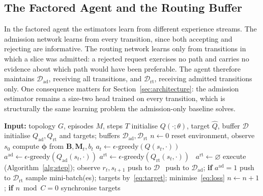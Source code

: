 \documentclass[10pt,journal,comsoc]{IEEEtran}
\begin{document}
\subsection{The Factored Agent and the Routing Buffer}
In the factored agent the estimators learn from different experience
streams. The admission network learns from every transition, since both
accepting and rejecting are informative. The routing network learns only
from transitions in which a slice was admitted: a rejected request
exercises no path and carries no evidence about which path would have been
preferable. The agent therefore maintains $\mathcal{D}_{\text{ad}}$,
receiving all transitions, and $\mathcal{D}_{\text{rt}}$, receiving
admitted transitions only. One consequence matters for
Section~\ref{sec:architecture}: the admission estimator remains a size-two
head trained on every transition, which is structurally the same learning
problem the admission-only baseline solves.

\begin{algorithm}[t]
\caption{Training loop for both architectures}
\label{alg:training}
\scriptsize
\begin{algorithmic}[1]
\State \textbf{Input:} topology $G$, episodes $M$, steps $T$
    \State initialise $Q(\cdot;\theta)$, target $\hat{Q}$, buffer $\mathcal{D}$
\Else
    \State initialise $Q_{\text{ad}},Q_{\text{rt}}$ and targets; buffers $\mathcal{D}_{\text{ad}},\mathcal{D}_{\text{rt}}$
\EndIf
\State $n \gets 0$
  \State reset environment, observe $s_0$
    \State compute $\boldsymbol{\phi}$ from $\mathbf{B},\mathbf{M}_t,b_t$ 
        \State $a_t \gets \epsilon\text{-greedy}(Q(s_t,\cdot))$
    \Else
        \State $a^{\text{ad}} \gets \epsilon\text{-greedy}(Q_{\text{ad}}(s_t,\cdot))$
         $a^{\text{rt}} \gets \epsilon\text{-greedy}(Q_{\text{rt}}(s_t,\cdot))$
        \Else\ $a^{\text{rt}} \gets \varnothing$ \EndIf
    \EndIf
    \State execute (Algorithm~\ref{alg:step}); observe $r_t,s_{t+1}$
     push to $\mathcal{D}$
    \Else\ push to $\mathcal{D}_{\text{ad}}$; \textbf{if} $a^{\text{ad}}=1$ push to $\mathcal{D}_{\text{rt}}$
    \EndIf
    \State sample mini-batch(es); targets by~\eqref{eq:target}; minimise~\eqref{eq:loss}
    \State $n \gets n+1$; \textbf{if} $n \bmod C = 0$ synchronise targets
  \EndFor
\EndFor
\end{algorithmic}
\end{algorithm}
\end{document}
